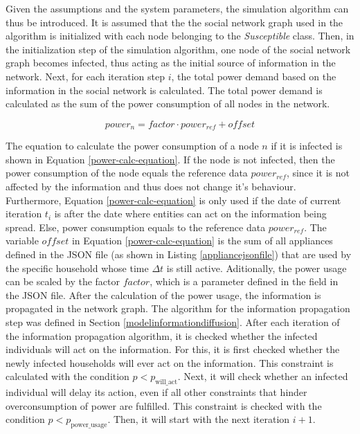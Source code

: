 Given the assumptions and the system parameters, the simulation 
algorithm can thus be introduced. 
It is assumed that the the social network graph used in the algorithm
is initialized with each node belonging to the \textit{Susceptible} class. 
Then, in the initialization step of the simulation algorithm,
one node of the social network graph becomes infected,
thus acting as the initial source of information in the network.
Next, for each iteration step $i$, the total power demand 
based on the information in the social network is calculated.
The total power demand is calculated as the sum of the 
power consumption of all nodes in the network. 

\begin{equation}
    power_n=factor \cdot power_{ref}+offset
    \label{power-calc-equation}
\end{equation}

The equation to calculate the power consumption 
of a node $n$ if it is infected is shown in Equation \ref{power-calc-equation}. 
If the node is not infected, then the power consumption of the node 
equals the reference data $power_{ref}$, since it is 
not affected by the information and thus does not change it's
behaviour. Furthermore, Equation \ref{power-calc-equation} 
is only used if the date of current iteration $t_i$
is after the date where entities can act 
on the information being spread. Else, power consumption
equals to the reference data $power_{ref}$.
The variable $offset$ in Equation \ref{power-calc-equation} 
is the sum of all appliances defined in the JSON file (as shown in Listing 
\ref{appliancejsonfile}) that are used by the 
specific household whose time $\Delta t$ is still active.
Aditionally, the power usage can be 
scaled by the factor $factor$, which is a parameter defined in 
the  field in the JSON file. 
After the calculation of the power usage, the information is 
propagated in the network graph. The algorithm 
for the information propagation step was defined in Section 
\ref{modelinformationdiffusion}.
After each iteration of the information propagation algorithm,
it is checked whether the infected individuals will act on 
the information. For this, it is first checked whether
the newly infected households will ever act on the information.
This constraint is calculated with the condition
$p<p_{\mathrm{will\_act}}$.
Next, it will check whether
an infected individual will delay its action, even if
all other constraints that hinder overconsumption of power
are fulfilled. This constraint is checked with the
condition $p<p_{\mathrm{power\_usage}}$. 
Then, it will start with the next iteration $i+1$.

